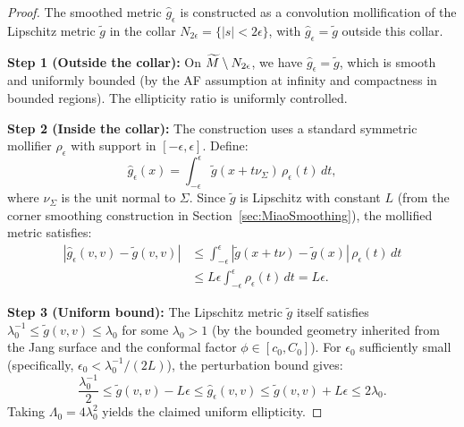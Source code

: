 \begin{proof}
The smoothed metric $\hat{g}_\epsilon$ is constructed as a convolution mollification of the Lipschitz metric $\tilde{g}$ in the collar $N_{2\epsilon} = \{|s| < 2\epsilon\}$, with $\hat{g}_\epsilon = \tilde{g}$ outside this collar.

\textbf{Step 1 (Outside the collar):} On $\widetilde{M} \setminus N_{2\epsilon}$, we have $\hat{g}_\epsilon = \tilde{g}$, which is smooth and uniformly bounded (by the AF assumption at infinity and compactness in bounded regions). The ellipticity ratio is uniformly controlled.

\textbf{Step 2 (Inside the collar):} The construction uses a standard symmetric mollifier $\rho_\epsilon$ with support in $[-\epsilon, \epsilon]$. Define:
\[
    \hat{g}_\epsilon(x) = \int_{-\epsilon}^{\epsilon} \tilde{g}(x + t\nu_\Sigma) \, \rho_\epsilon(t) \, dt,
\]
where $\nu_\Sigma$ is the unit normal to $\Sigma$. Since $\tilde{g}$ is Lipschitz with constant $L$ (from the corner smoothing construction in Section~\ref{sec:MiaoSmoothing}), the mollified metric satisfies:
\begin{align}
    |\hat{g}_\epsilon(v, v) - \tilde{g}(v, v)| &\le \int_{-\epsilon}^{\epsilon} |\tilde{g}(x + t\nu) - \tilde{g}(x)| \, \rho_\epsilon(t) \, dt \\
    &\le L \epsilon \int_{-\epsilon}^{\epsilon} \rho_\epsilon(t) \, dt = L\epsilon.
\end{align}

\textbf{Step 3 (Uniform bound):} The Lipschitz metric $\tilde{g}$ itself satisfies $\lambda_0^{-1} \le \tilde{g}(v,v) \le \lambda_0$ for some $\lambda_0 > 1$ (by the bounded geometry inherited from the Jang surface and the conformal factor $\phi \in [c_0, C_0]$). For $\epsilon_0$ sufficiently small (specifically, $\epsilon_0 < \lambda_0^{-1}/(2L)$), the perturbation bound gives:
\[
    \frac{\lambda_0^{-1}}{2} \le \tilde{g}(v,v) - L\epsilon \le \hat{g}_\epsilon(v,v) \le \tilde{g}(v,v) + L\epsilon \le 2\lambda_0.
\]
Taking $\Lambda_0 = 4\lambda_0^2$ yields the claimed uniform ellipticity.


\end{proof}
